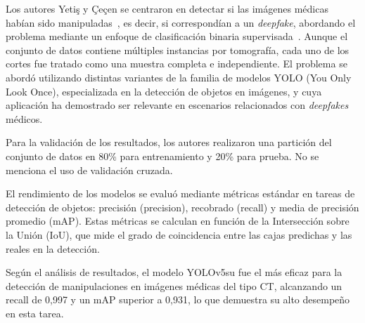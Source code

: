 \documentclass[conference]{IEEEtran}
\begin{document}
Los autores Yetiş y Çeçen se centraron en detectar si las imágenes médicas habían sido manipuladas~\cite{yetis2024}, es decir, si correspondían a un \textit{deepfake}, abordando el problema mediante un enfoque de clasificación binaria supervisada~\cite{yetis2024}. Aunque el conjunto de datos contiene múltiples instancias por tomografía, cada uno de los cortes fue tratado como una muestra completa e independiente. El problema se abordó utilizando distintas variantes de la familia de modelos YOLO (You Only Look Once), especializada en la detección de objetos en imágenes, y cuya aplicación ha demostrado ser relevante en escenarios relacionados con \textit{deepfakes} médicos.

Para la validación de los resultados, los autores realizaron una partición del conjunto de datos en 80\% para entrenamiento y 20\% para prueba. No se menciona el uso de validación cruzada.

El rendimiento de los modelos se evaluó mediante métricas estándar en tareas de detección de objetos: precisión (precision), recobrado (recall) y media de precisión promedio (mAP). Estas métricas se calculan en función de la Intersección sobre la Unión (IoU), que mide el grado de coincidencia entre las cajas predichas y las reales en la detección.

Según el análisis de resultados, el modelo YOLOv5su fue el más eficaz para la detección de manipulaciones en imágenes médicas del tipo CT, alcanzando un recall de 0,997 y un mAP superior a 0,931, lo que demuestra su alto desempeño en esta tarea.



\end{document}
